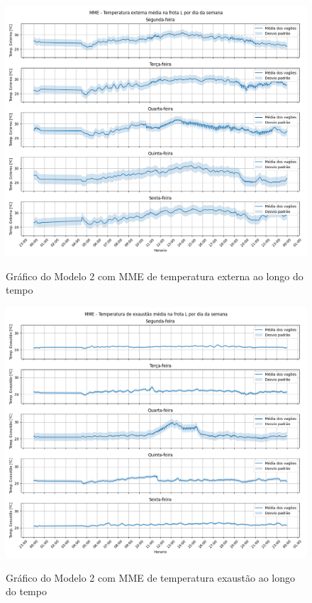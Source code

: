 \documentclass[acronym,symbols,table]{fei}
\begin{document}
\begin{figure}[!htb]
	    \centering
	    \caption{Gráfico do Modelo 2 com MME de temperatura externa ao longo do tempo}
        \includegraphics[width=0.8\linewidth]{Imagens/MME_-_Temperatura_externa_media_na_frota_L_por_dia_da_semana.png}
        \label{fig:temperaturaextmodelo2}
\end{figure}

\begin{figure}[!htb]
	\centering
	\caption{Gráfico do Modelo 2 com MME de temperatura exaustão ao longo do tempo}
    \includegraphics[width=0.8\linewidth]{Imagens/MME_-_Temperatura_de_exaustao_media_na_frota_L_por_dia_da_semana.png}
    \label{fig:temperaturaexaumodelo2}
\end{figure}

\newpage 
\end{document}
